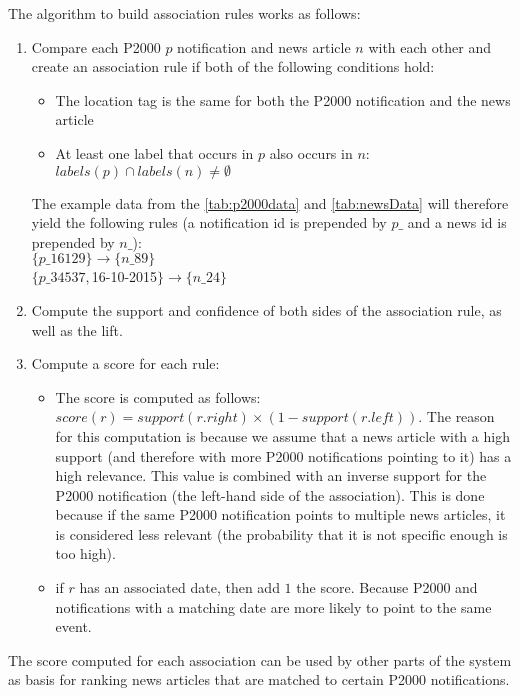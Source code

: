 The algorithm to build association rules works as follows:
\begin{enumerate}
\item Compare each P2000 $p$ notification and news article $n$ with each other and create an association rule if both of the following conditions hold: 
	\begin{itemize}[noitemsep]
	\item The location tag is the same for both the P2000 notification and the news article
	\item At least one label that occurs in $p$ also occurs in $n$: $labels(p) \cap labels(n) \not= \emptyset$
	\end{itemize}
The example data from the \autoref{tab:p2000data} and \autoref{tab:newsData} will therefore yield the following rules (a notification id is prepended by $p\_$ and a news id is prepended by $n\_$):\\
$\{p\_16129\} \rightarrow \{n\_89\}$\\
$\{p\_34537, $16-10-2015$\} \rightarrow \{n\_24\}$
\item Compute the support and confidence of both sides of the association rule, as well as the lift.
\item Compute a score for each rule:
	\begin{itemize}
	\item The score is computed as follows: $score(r) = support(r.right) \times (1-support(r.left))$. The reason for this computation is because we assume that a news article with a high support (and therefore with more P2000 notifications pointing to it) has a high relevance. This value is combined with an inverse support for the P2000 notification (the left-hand side of the association). This is done because if the same P2000 notification points to multiple news articles, it is considered less relevant (the probability that it is not specific enough is too high). 
	\item if $r$ has an associated date, then add $1$ the score. Because P2000 and notifications with a matching date are more likely to point to the same event.
	\end{itemize}
\end{enumerate}

The score computed for each association can be used by other parts of the system as basis for ranking news articles that are matched to certain P2000 notifications.

